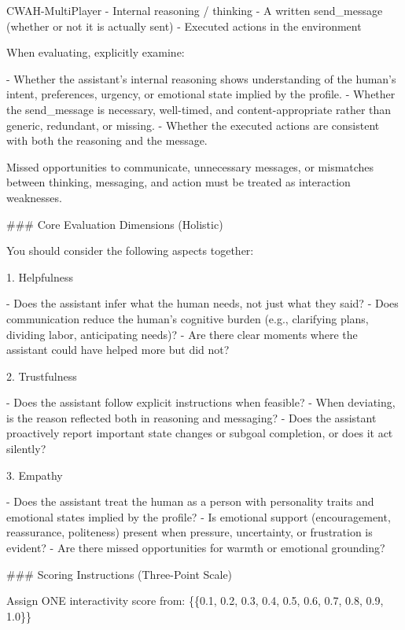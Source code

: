 \documentclass{article}
\theoremstyle{plain}
\theoremstyle{definition}
\theoremstyle{remark}
\begin{document}
\begin{myexample}{CWAH-MultiPlayer}
- Internal reasoning / thinking
- A written send\_message (whether or not it is actually sent)
- Executed actions in the environment
\leavevmode\par
When evaluating, explicitly examine: 
\leavevmode\par
- Whether the assistant’s internal reasoning shows understanding of the human's intent, preferences, urgency, or emotional state implied by the profile. 
- Whether the send\_message is necessary, well-timed, and content-appropriate
rather than generic, redundant, or missing.
- Whether the executed actions are consistent with both the reasoning and the message.
\leavevmode\par
Missed opportunities to communicate, unnecessary messages, or mismatches between thinking, messaging, and action must be treated as interaction weaknesses.
\leavevmode\par
\leavevmode\par
\#\#\# Core Evaluation Dimensions (Holistic)
\leavevmode\par
You should consider the following aspects together:
\leavevmode\par
1. Helpfulness
\leavevmode\par
- Does the assistant infer what the human needs, not just what they said?
- Does communication reduce the human’s cognitive burden (e.g., clarifying plans, dividing labor, anticipating needs)?
- Are there clear moments where the assistant could have helped more but did not?
\leavevmode\par
2. Trustfulness
\leavevmode\par
- Does the assistant follow explicit instructions when feasible?
- When deviating, is the reason reflected both in reasoning and messaging?
- Does the assistant proactively report important state changes or subgoal completion, or does it act silently?
\leavevmode\par
3. Empathy
\leavevmode\par
- Does the assistant treat the human as a person with personality traits and emotional states implied by the profile?
- Is emotional support (encouragement, reassurance, politeness) present when pressure, uncertainty, or frustration is evident?
- Are there missed opportunities for warmth or emotional grounding?
\leavevmode\par
\#\#\# Scoring Instructions (Three-Point Scale)
\leavevmode\par
Assign ONE interactivity score from: \{\{0.1, 0.2, 0.3, 0.4, 0.5, 0.6, 0.7, 0.8, 0.9, 1.0\}\}
\leavevmode\par

\end{myexample}
\end{document}
